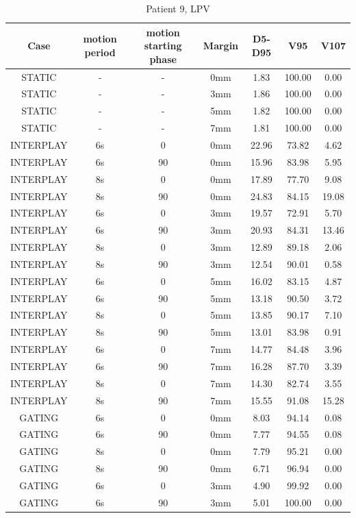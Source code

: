 \documentclass[type=dr, dr=rernat, accentcolor=tud7b,colorbacktitle, bigchapter, openright, twoside, 12pt ]{tudthesis}
\begin{document}
\begin{table}[H]
  \centering
  \caption{Patient 9, LPV}
  \begin{tabular}{|c||c|c|c||c|c|c|}
    \hline\hline
    Case & motion period & motion starting phase & Margin & D5-D95 & V95 & V107\\
    \hline 
STATIC & - & - & 0mm & 1.83 & 100.00 & 0.00 \\
STATIC & - & - & 3mm & 1.86 & 100.00 & 0.00 \\
STATIC & - & - & 5mm & 1.82 & 100.00 & 0.00 \\
STATIC & - & - & 7mm & 1.81 & 100.00 & 0.00 \\
INTERPLAY & 6s & 0 & 0mm & 22.96 & 73.82 & 4.62 \\
INTERPLAY & 6s & 90 & 0mm & 15.96 & 83.98 & 5.95 \\
INTERPLAY & 8s & 0 & 0mm & 17.89 & 77.70 & 9.08 \\
INTERPLAY & 8s & 90 & 0mm & 24.83 & 84.15 & 19.08 \\
INTERPLAY & 6s & 0 & 3mm & 19.57 & 72.91 & 5.70 \\
INTERPLAY & 6s & 90 & 3mm & 20.93 & 84.31 & 13.46 \\
INTERPLAY & 8s & 0 & 3mm & 12.89 & 89.18 & 2.06 \\
INTERPLAY & 8s & 90 & 3mm & 12.54 & 90.01 & 0.58 \\
INTERPLAY & 6s & 0 & 5mm & 16.02 & 83.15 & 4.87 \\
INTERPLAY & 6s & 90 & 5mm & 13.18 & 90.50 & 3.72 \\
INTERPLAY & 8s & 0 & 5mm & 13.85 & 90.17 & 7.10 \\
INTERPLAY & 8s & 90 & 5mm & 13.01 & 83.98 & 0.91 \\
INTERPLAY & 6s & 0 & 7mm & 14.77 & 84.48 & 3.96 \\
INTERPLAY & 6s & 90 & 7mm & 16.28 & 87.70 & 3.39 \\
INTERPLAY & 8s & 0 & 7mm & 14.30 & 82.74 & 3.55 \\
INTERPLAY & 8s & 90 & 7mm & 15.55 & 91.08 & 15.28 \\
GATING & 6s & 0 & 0mm & 8.03 & 94.14 & 0.08 \\
GATING & 6s & 90 & 0mm & 7.77 & 94.55 & 0.08 \\
GATING & 8s & 0 & 0mm & 7.79 & 95.21 & 0.00 \\
GATING & 8s & 90 & 0mm & 6.71 & 96.94 & 0.00 \\
GATING & 6s & 0 & 3mm & 4.90 & 99.92 & 0.00 \\
GATING & 6s & 90 & 3mm & 5.01 & 100.00 & 0.00 \\

\end{tabular}
\end{table}
\end{document}
